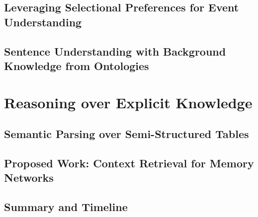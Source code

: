 \documentclass[12pt]{cmuthesis}
\begin{document}
\chapter{Leveraging Selectional Preferences for Event Understanding}
\label{chapter:nem}

\chapter{Sentence Understanding with Background Knowledge from Ontologies}
\label{chapter:ontolstm}

\part{Reasoning over Explicit Knowledge}
\chapter{Semantic Parsing over Semi-Structured Tables}
\label{chapter:neural_semantic_parsing}

\chapter{Proposed Work: Context Retrieval for Memory Networks}
\label{chapter:memnet_qa}

\chapter{Summary and Timeline}


%

\backmatter


\renewcommand{\bibsection}{\chapter{\bibname}}

\end{document}

